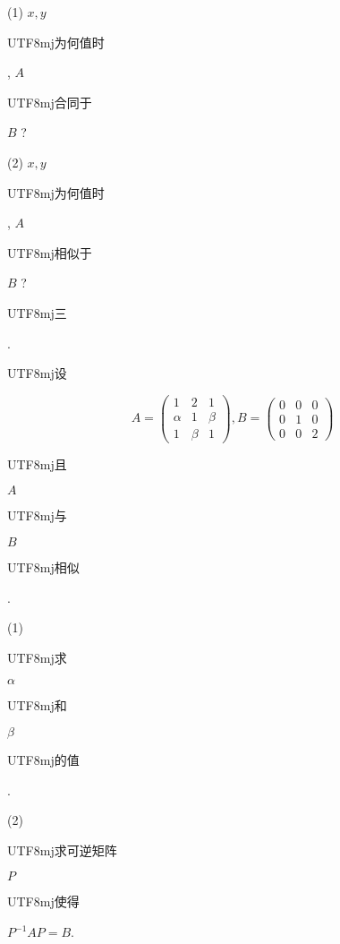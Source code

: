 \documentclass[10pt]{article}
\begin{document}
(1) $x, y$ \begin{CJK}{UTF8}{mj}为何值时\end{CJK}, $A$ \begin{CJK}{UTF8}{mj}合同于\end{CJK} $B$ ?

(2) $x, y$ \begin{CJK}{UTF8}{mj}为何值时\end{CJK}, $A$ \begin{CJK}{UTF8}{mj}相似于\end{CJK} $B$ ?

\begin{CJK}{UTF8}{mj}三\end{CJK}. \begin{CJK}{UTF8}{mj}设\end{CJK}
$$
A=\left(\begin{array}{ccc}
1 & 2 & 1 \\
\alpha & 1 & \beta \\
1 & \beta & 1
\end{array}\right), B=\left(\begin{array}{lll}
0 & 0 & 0 \\
0 & 1 & 0 \\
0 & 0 & 2
\end{array}\right)
$$
\begin{CJK}{UTF8}{mj}且\end{CJK} $A$ \begin{CJK}{UTF8}{mj}与\end{CJK} $B$ \begin{CJK}{UTF8}{mj}相似\end{CJK}.

(1) \begin{CJK}{UTF8}{mj}求\end{CJK} $\alpha$ \begin{CJK}{UTF8}{mj}和\end{CJK} $\beta$ \begin{CJK}{UTF8}{mj}的值\end{CJK}.

(2) \begin{CJK}{UTF8}{mj}求可逆矩阵\end{CJK} $P$ \begin{CJK}{UTF8}{mj}使得\end{CJK} $P^{-1} A P=B$.
\end{document}
